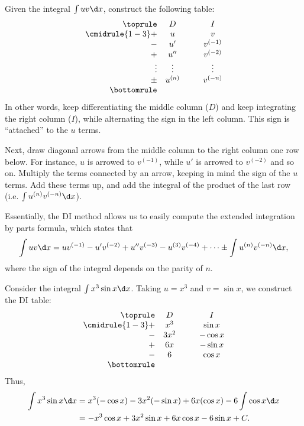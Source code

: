 \begin{recipe}[DI Method]
    Given the integral $\int uv \d x $, construct the following table:
    \[
    \begin{array}{r c @{\hspace*{1.0cm}} c}\toprule
        & D & I \\\cmidrule{1-3}
        + & u & v \\
        - & u' & v^{(-1)} \\
        + & u'' & v^{(-2)} \\
        \vdots & \vdots & \vdots \\
        \pm & u^{(n)} & v^{(-n)}\\\bottomrule
    \end{array}
    \]
    In other words, keep differentiating the middle column ($D$) and keep integrating the right column ($I$), while alternating the sign in the left column. This sign is ``attached'' to the $u$ terms.

    Next, draw diagonal arrows from the middle column to the right column one row below. For instance, $u$ is arrowed to $v^{(-1)}$, while $u'$ is arrowed to $v^{(-2)}$ and so on. Multiply the terms connected by an arrow, keeping in mind the sign of the $u$ terms. Add these terms up, and add the integral of the product of the last row (i.e. $\int u^{(n)} v^{(-n)} \d x$).
\end{recipe}

Essentially, the DI method allows us to easily compute the extended integration by parts formula, which states that \[\int uv \d x = u v^{(-1)} - u' v^{(-2)} + u'' v^{(-3)} - u^{(3)} v^{(-4)} + \dots \pm \int u^{(n)} v^{(-n)} \d x,\] where the sign of the integral depends on the parity of $n$.

\begin{example}[DI Method]
    Consider the integral $\int x^3 \sin x \d x$. Taking $u = x^3$ and $v = \sin x$, we construct the DI table:
    \[
    \begin{array}{r c @{\hspace*{1.0cm}} c}\toprule
        & D & I \\\cmidrule{1-3}
        + & x^3 & \sin x \\
        - & 3x^2 & -\cos x \\
        + & 6x & -\sin x\\
        - & 6 & \cos x\\\bottomrule
    \end{array}
    \]
    Thus,
    \begin{align*}
        \int x^3 \sin x \d x &= x^3 (-\cos x) - 3x^2(-\sin x) + 6x(\cos x) - 6\int \cos x \d x\\
        &= -x^3 \cos x + 3x^2 \sin x + 6x\cos x - 6\sin x + C.
    \end{align*}
\end{example}